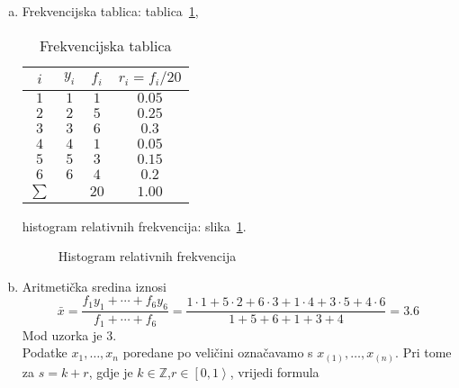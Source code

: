 \documentclass[12pt]{scrartcl}
\begin{document}
\begin{rjesenje}
\begin{enumerate}[(a)]
\item Frekvencijska tablica: tablica~\ref{tbl:frekvtablzad},
\begin{table}[ht]
\centering
\begin{tabular}{c|c|c|c}
$i$    & $y_i$ & $f_i$ & $r_i=f_i/20$ \\ \hline
$1$    & $1$   & $1$   & $0.05$       \\
$2$    & $2$   & $5$   & $0.25$       \\
$3$    & $3$   & $6$   & $0.3$        \\
$4$    & $4$   & $1$   & $0.05$       \\
$5$    & $5$   & $3$   & $0.15$       \\
$6$    & $6$   & $4$   & $0.2$        \\ \hline
$\sum$ &       & $20$  & $1.00$      
\end{tabular}
\caption{Frekvencijska tablica}
\label{tbl:frekvtablzad}
\end{table}
histogram relativnih frekvencija: slika~\ref{fig:histrelfrekvzad}.
\begin{figure}
    \centering
    \caption{Histogram relativnih frekvencija}
    \label{fig:histrelfrekvzad}
\end{figure}
\item Aritmetička sredina iznosi
\begin{equation}
    \bar{x}=\dfrac{f_1y_1+\cdots+f_6y_6}{f_1+\cdots+f_6}=
    \dfrac{1\cdot1+5\cdot2+6\cdot3+1\cdot4+3\cdot5+4\cdot6}{1+5+6+1+3+4}=3.6
\end{equation}
Mod uzorka je $3$. \\
Podatke $x_1,\dotsc,x_n$ poredane po veličini označavamo s $x_{(1)},\dotsc,x_{(n)}$. Pri tome za $s=k+r$, gdje je $k\in \mathbb{Z}$,$r\in \left[0,1\right>$, vrijedi formula

\end{enumerate}
\end{rjesenje}
\end{document}
